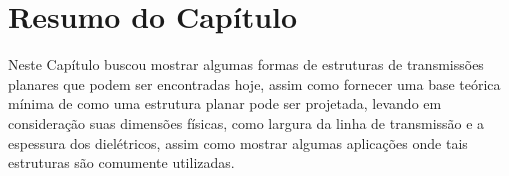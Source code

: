 
\section{Resumo do Capítulo}

Neste Capítulo buscou mostrar algumas formas de estruturas de transmissões planares que podem ser encontradas hoje, assim como fornecer uma base teórica mínima de como uma estrutura planar pode ser projetada, levando em consideração suas dimensões físicas, como largura da linha de transmissão e a espessura dos dielétricos, assim como mostrar algumas aplicações onde tais estruturas são comumente utilizadas.